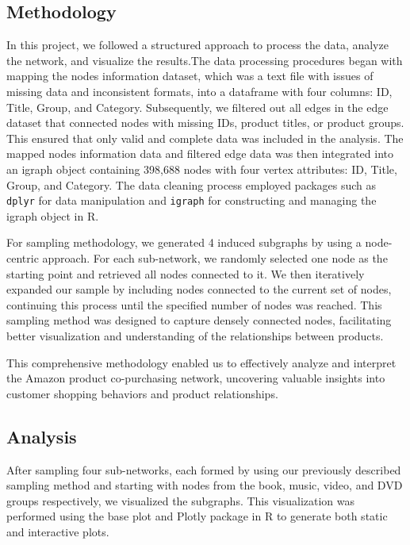 \documentclass[
]{article}
\begin{document}
\subsection{Methodology}\label{methodology}

In this project, we followed a structured approach to process the data,
analyze the network, and visualize the results.The data processing
procedures began with mapping the nodes information dataset, which was a
text file with issues of missing data and inconsistent formats, into a
dataframe with four columns: ID, Title, Group, and Category.
Subsequently, we filtered out all edges in the edge dataset that
connected nodes with missing IDs, product titles, or product groups.
This ensured that only valid and complete data was included in the
analysis. The mapped nodes information data and filtered edge data was
then integrated into an igraph object containing 398,688 nodes with four
vertex attributes: ID, Title, Group, and Category. The data cleaning
process employed packages such as \texttt{dplyr} for data manipulation
and \texttt{igraph} for constructing and managing the igraph object in
R.

For sampling methodology, we generated 4 induced subgraphs by using a
node-centric approach. For each sub-network, we randomly selected one
node as the starting point and retrieved all nodes connected to it. We
then iteratively expanded our sample by including nodes connected to the
current set of nodes, continuing this process until the specified number
of nodes was reached. This sampling method was designed to capture
densely connected nodes, facilitating better visualization and
understanding of the relationships between products.

This comprehensive methodology enabled us to effectively analyze and
interpret the Amazon product co-purchasing network, uncovering valuable
insights into customer shopping behaviors and product relationships.

\subsection{Analysis}\label{analysis}

After sampling four sub-networks, each formed by using our previously
described sampling method and starting with nodes from the book, music,
video, and DVD groups respectively, we visualized the subgraphs. This
visualization was performed using the base plot and Plotly package in R
to generate both static and interactive plots.
\end{document}
